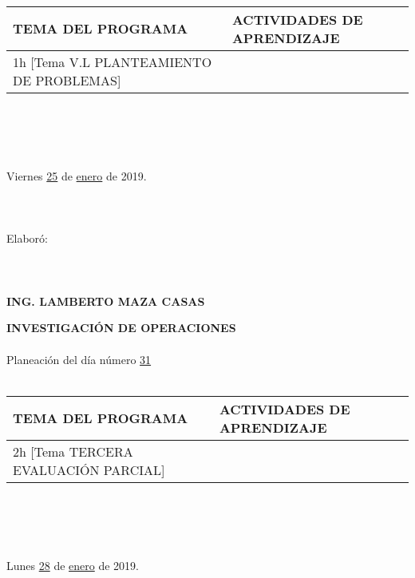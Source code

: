 \documentclass[landscape]{article}
\begin{document}
{\begin{center}
\ \\
\begin{tabular}{|p{11cm}|p{8cm}|}\hline
{\bf TEMA DEL PROGRAMA}&{\bf ACTIVIDADES DE APRENDIZAJE}\\\hline
	1h	[Tema V.L PLANTEAMIENTO DE PROBLEMAS]
&\\
\hline
\end{tabular}
\ \\
\ \\
\ \\
\ \\
Viernes \underline{\hspace{0.5cm}25\hspace{0.5cm}} de  \underline{\hspace{0.5cm}enero\hspace{0.5cm}} de 2019.
\ \\
\ \\
\ \\
\ \\
Elabor\'o:
\ \\
\ \\
\ \\
\ \\
{\bf ING. LAMBERTO MAZA CASAS}
\end{center}
\eject
\begin{center}
{\bf 
INVESTIGACI\'ON DE OPERACIONES
}
\ \\
\ \\
Planeaci\'on del d\'ia n\'umero \underline{\hspace{0.5cm}31\hspace{0.5cm}}
\ \\
\ \\
\begin{tabular}{|p{11cm}|p{8cm}|}\hline
{\bf TEMA DEL PROGRAMA}&{\bf ACTIVIDADES DE APRENDIZAJE}\\\hline
	2h	[Tema TERCERA EVALUACI\'ON PARCIAL]
&\\
\hline
\end{tabular}
\ \\
\ \\
\ \\
\ \\
Lunes \underline{\hspace{0.5cm}28\hspace{0.5cm}} de  \underline{\hspace{0.5cm}enero\hspace{0.5cm}} de 2019.
\ \\
\ \\
\ \\

\end{center}}
\end{document}
